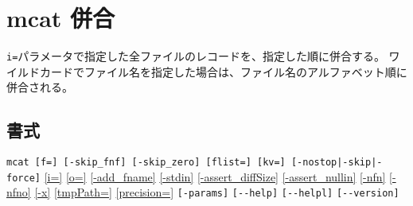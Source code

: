 
%

\section{mcat 併合\label{sect:mcat}}
\verb|i=|パラメータで指定した全ファイルのレコードを、指定した順に併合する。
ワイルドカードでファイル名を指定した場合は、ファイル名のアルファベット順に併合される。

\subsection*{書式}
\verb/mcat [f=] [-skip_fnf] [-skip_zero] [flist=] [kv=] [-nostop|-skip|-force]/
\hyperref[sect:option_i]{[i=]}
\hyperref[sect:option_o]{[o=]}
\hyperref[sect:option_add_fname]{[-add\_fname]}
\hyperref[sect:option_-stdin]{[-stdin]}
\hyperref[sect:option_assert_diffSize]{[-assert\_diffSize]}
\hyperref[sect:option_assert_nullin]{[-assert\_nullin]}
\hyperref[sect:option_nfn]{[-nfn]} 
\hyperref[sect:option_nfno]{[-nfno]}  
\hyperref[sect:option_x]{[-x]}
\hyperref[sect:option_option_tmppath]{[tmpPath=]}
\hyperref[sect:option_precision]{[precision=]}
\verb|[-params]|
\verb|[--help]|
\verb|[--helpl]|
\verb|[--version]|\\

